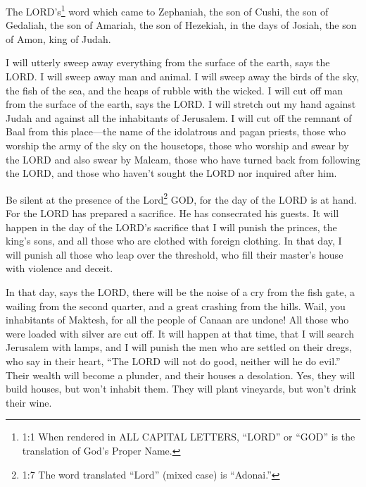 




\vspace{-1.36in}


\mychapter{} \myverse*{}The LORD’s\footnote{1:1 When rendered in ALL CAPITAL LETTERS, “LORD” or “GOD” is the translation of God’s Proper Name.} word which came to Zephaniah, the son of Cushi, the son of Gedaliah, the son of Amariah, the son of Hezekiah, in the days of Josiah, the son of Amon, king of Judah.


\myverse{}I will utterly sweep away everything from the surface of the earth, says the LORD. \myverse{}I will sweep away man and animal. I will sweep away the birds of the sky, the fish of the sea, and the heaps of rubble with the wicked. I will cut off man from the surface of the earth, says the LORD. \myverse{}I will stretch out my hand against Judah and against all the inhabitants of Jerusalem. I will cut off the remnant of Baal from this place—the name of the idolatrous and pagan priests, \myverse{}those who worship the army of the sky on the housetops, those who worship and swear by the LORD and also swear by Malcam, \myverse{}those who have turned back from following the LORD, and those who haven’t sought the LORD nor inquired after him.


\myverse{}Be silent at the presence of the Lord\footnote{1:7 The word translated “Lord” (mixed case) is “Adonai.”} GOD, for the day of the LORD is at hand. For the LORD has prepared a sacrifice. He has consecrated his guests. \myverse{}It will happen in the day of the LORD’s sacrifice that I will punish the princes, the king’s sons, and all those who are clothed with foreign clothing. \myverse{}In that day, I will punish all those who leap over the threshold, who fill their master’s house with violence and deceit.


\myverse{}In that day, says the LORD, there will be the noise of a cry from the fish gate, a wailing from the second quarter, and a great crashing from the hills. \myverse{}Wail, you inhabitants of Maktesh, for all the people of Canaan are undone! All those who were loaded with silver are cut off. \myverse{}It will happen at that time, that I will search Jerusalem with lamps, and I will punish the men who are settled on their dregs, who say in their heart, “The LORD will not do good, neither will he do evil.” \myverse{}Their wealth will become a plunder, and their houses a desolation. Yes, they will build houses, but won’t inhabit them. They will plant vineyards, but won’t drink their wine.



